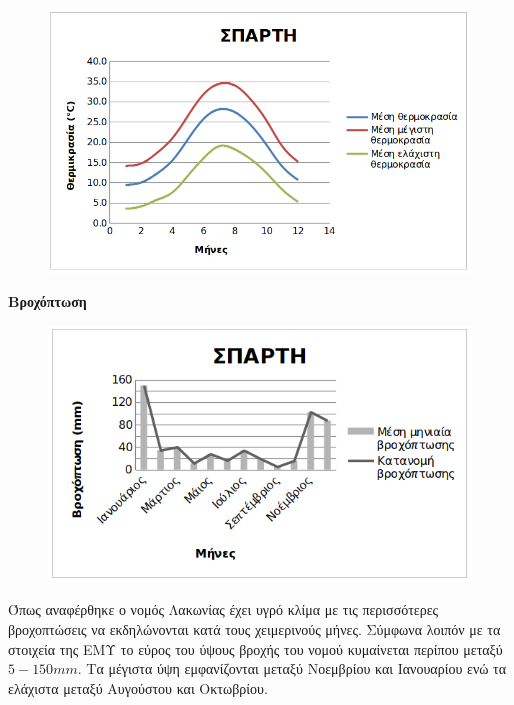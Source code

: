 \documentclass[12pt]{article}
\begin{document}
	\begin{figure} [H]
		\begin{center}
			\includegraphics [scale = 0.80] {sparth.png}
		\end{center}
	\end{figure}

	\textbf{Βροχόπτωση}
	
	\begin{figure} [H]
		\begin{center}
			\includegraphics [scale = 0.80] {sparti2.png}
		\end{center}
	\end{figure}
	
	Όπως αναφέρθηκε ο νομός Λακωνίας έχει υγρό κλίμα με τις περισσότερες βροχοπτώσεις να εκδηλώνονται κατά τους χειμερινούς μήνες. Σύμφωνα λοιπόν με τα στοιχεία της ΕΜΥ το εύρος του ύψους βροχής του νομού κυμαίνεται περίπου μεταξύ $5-150mm$. Τα μέγιστα ύψη εμφανίζονται μεταξύ Νοεμβρίου και Ιανουαρίου ενώ τα ελάχιστα μεταξύ Αυγούστου και Οκτωβρίου. 
	
\end{document}
